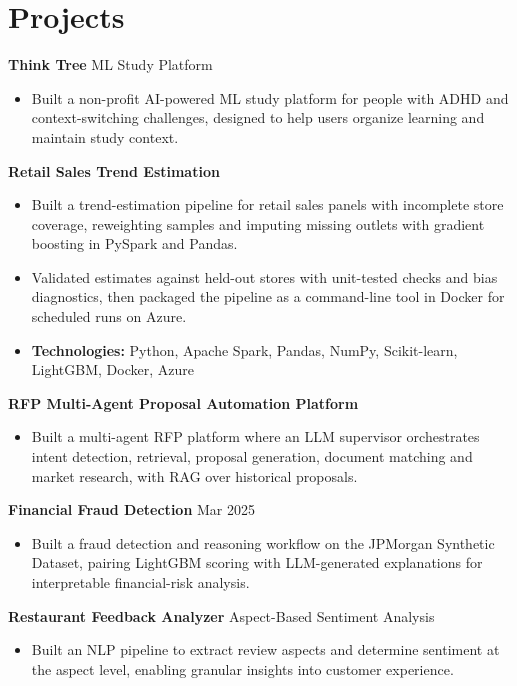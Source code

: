 \documentclass[10pt,a4paper]{article}
\begin{document}
\section{Projects}
\textbf{Think Tree} \textbar{} ML Study Platform\par
\begin{itemize}
  \item Built a non-profit AI-powered ML study platform for people with ADHD and context-switching challenges, designed to help users organize learning and maintain study context.
\end{itemize}
\textbf{Retail Sales Trend Estimation}\par
\begin{itemize}
  \item Built a trend-estimation pipeline for retail sales panels with incomplete store coverage, reweighting samples and imputing missing outlets with gradient boosting in PySpark and Pandas.
  \item Validated estimates against held-out stores with unit-tested checks and bias diagnostics, then packaged the pipeline as a command-line tool in Docker for scheduled runs on Azure.
  \item \textbf{Technologies:} Python, Apache Spark, Pandas, NumPy, Scikit-learn, LightGBM, Docker, Azure
\end{itemize}
\textbf{RFP Multi-Agent Proposal Automation Platform}\par
\begin{itemize}
  \item Built a multi-agent RFP platform where an LLM supervisor orchestrates intent detection, retrieval, proposal generation, document matching and market research, with RAG over historical proposals.
\end{itemize}
\textbf{Financial Fraud Detection} \textbar{} Mar 2025\par
\begin{itemize}
  \item Built a fraud detection and reasoning workflow on the JPMorgan Synthetic Dataset, pairing LightGBM scoring with LLM-generated explanations for interpretable financial-risk analysis.
\end{itemize}
\textbf{Restaurant Feedback Analyzer} \textbar{} Aspect-Based Sentiment Analysis\par
\begin{itemize}
  \item Built an NLP pipeline to extract review aspects and determine sentiment at the aspect level, enabling granular insights into customer experience.
\end{itemize}
\end{document}
